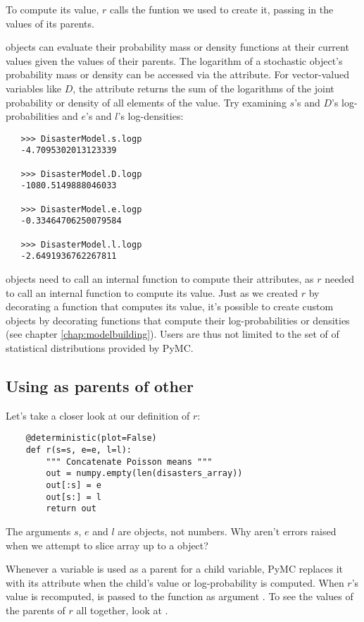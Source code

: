 To compute its value, $r$ calls the funtion we used to create it, passing in the values of its parents.

 objects can evaluate their probability mass or density functions at their current values given the values of their parents. The logarithm of a stochastic object's probability mass or density can be accessed via the  attribute. For vector-valued variables like $D$, the  attribute returns the sum of the logarithms of the joint probability or density of all elements of the value. Try examining $s$'s and $D$'s log-probabilities and $e$'s and $l$'s log-densities:
\begin{verbatim}
   >>> DisasterModel.s.logp
   -4.7095302013123339

   >>> DisasterModel.D.logp
   -1080.5149888046033

   >>> DisasterModel.e.logp
   -0.33464706250079584

   >>> DisasterModel.l.logp
   -2.6491936762267811
\end{verbatim}
 objects need to call an internal function to compute their  attributes, as $r$ needed to call an internal function to compute its value. Just as we created $r$ by decorating a function that computes its value, it's possible to create custom  objects by decorating functions that compute their log-probabilities or densities (see chapter \ref{chap:modelbuilding}). Users are thus not limited to the set of of statistical distributions provided by PyMC.

\subsection[Using Variables as parents of other Variables]{Using
 as parents of other }

Let's take a closer look at our definition of $r$:
\begin{verbatim}
	@deterministic(plot=False)
	def r(s=s, e=e, l=l):
	    """ Concatenate Poisson means """
	    out = numpy.empty(len(disasters_array))
	    out[:s] = e
	    out[s:] = l
	    return out
\end{verbatim}
The arguments $s$, $e$ and $l$ are  objects, not numbers. Why aren't errors raised when we attempt to slice array  up to a  object?

Whenever a variable is used as a parent for a child variable, PyMC replaces it with its  attribute when the child's value or log-probability is computed. When $r$'s value is recomputed,  is passed to the function as argument . To see the values of the parents of $r$ all together, look at .

